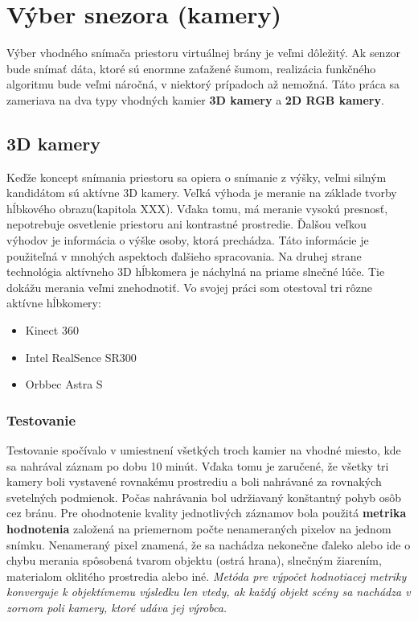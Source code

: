 \section{Výber snezora (kamery)}
Výber vhodného snímača priestoru virtuálnej brány je veľmi dôležitý. Ak senzor bude snímať dáta, ktoré sú enormne zaťažené šumom, realizácia funkčného algoritmu bude veľmi náročná, v niektorý prípadoch až nemožná. Táto práca sa zameriava na dva typy vhodných kamier \textbf{3D kamery} a\textbf{ 2D  RGB kamery}.

\subsection{3D kamery}
Keďže  koncept snímania priestoru sa opiera o snímanie z výšky, veľmi silným kandidátom sú aktívne 3D kamery. Veľká výhoda je meranie na základe tvorby hĺbkového obrazu(kapitola XXX). Vďaka tomu, má meranie vysokú presnosť, nepotrebuje osvetlenie priestoru ani kontrastné prostredie.  Ďalšou veľkou výhodov je informácia o výške osoby, ktorá prechádza. Táto informácie je použiteľná v mnohých aspektoch ďalšieho spracovania. Na druhej strane technológia aktívneho 3D hĺbkomera je náchylná na priame slnečné lúče. Tie dokážu merania veľmi znehodnotiť. Vo svojej práci som otestoval tri rôzne aktívne hĺbkomery: 

\begin{itemize}
\item Kinect 360
\item Intel RealSence SR300
\item Orbbec Astra S
\end{itemize}

\subsubsection{Testovanie}
Testovanie spočívalo v umiestnení všetkých troch kamier na vhodné miesto, kde sa nahrával záznam po dobu 10 minút. Vďaka tomu je zaručené, že všetky tri kamery boli vystavené rovnakému prostrediu a boli nahrávané za rovnakých svetelných podmienok.  Počas nahrávania bol udržiavaný konštantný pohyb osôb cez bránu. Pre ohodnotenie kvality jednotlivých záznamov bola použitá \textbf{metrika hodnotenia} založená na priemernom počte nenameraných pixelov na jednom snímku. Nenameraný pixel znamená, že sa nachádza nekonečne ďaleko alebo ide o chybu merania spôsobená tvarom objektu (ostrá hrana), slnečným žiarením, materialom oklitého prostredia alebo iné. \textit{Metóda pre výpočet hodnotiacej metriky konverguje k objektívnemu výsledku len vtedy, ak každý objekt scény sa nachádza v zornom poli kamery, ktoré udáva jej výrobca.}  

